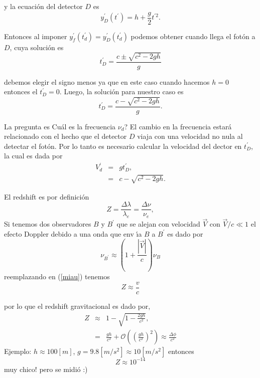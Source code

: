 \documentclass[notitlepage,11pt]{article}
\begin{document}
y la ecuación del detector $D$ es 
\begin{equation}
y_{D}^{\prime }\left( t^{\prime }\right) =h+\frac{g}{2}t^{\prime 2}.
\end{equation}

Entonces al imponer $y_{f}^{\prime }\left( t_{d}^{\prime }\right)
=y_{D}^{\prime }\left( t_{d}^{\prime }\right) $ podemos obtener cuando llega
el fotón a $D$, cuya solución es 
\begin{equation*}
t_{D}^{\prime }=\frac{c\pm \sqrt{c^{2}-2gh}}{g}
\end{equation*}

debemos elegir el signo menos ya que en este caso cuando hacemos $h=0$
entonces el $t_{D}^{\prime }=0$. Luego, la solución para nuestro caso es 
\begin{equation}
t_{D}^{\prime }=\frac{c-\sqrt{c^{2}-2gh}}{g}.
\end{equation}

La pregunta es \textquestiondown Cuál es la frecuencia $\nu _{d}$? El
cambio en la frecuencia estará relacionado con el hecho que el detector $%
D$ viaja con una velocidad no nula al detectar el fotón. Por lo tanto es
necesario calcular la velocidad del dector en $t_{D}^{\prime }$, la cual es
dada por 
\begin{eqnarray*}
V_{d}^{\prime } &=&gt_{D}^{\prime }, \\
&=&c-\sqrt{c^{2}-2gh}.
\end{eqnarray*}

El redshift es por definición 
\begin{equation}
Z=\frac{\Delta \lambda }{\lambda _{e}}=\frac{\Delta \nu }{\nu _{e}},
\label{miau}
\end{equation}%
Si tenemos dos observadores $B$ y $B^{\prime }$ que se alejan con velocidad $%
\vec{V}$ con $\vec{V}/c\ll 1$ el efecto Doppler debido a una onda que env%
\'{\i}a $B$ a $B^{\prime }$ es dado por 
\begin{equation*}
\nu _{B^{\prime }}\approx \left( 1+\frac{\left\vert \vec{V}\right\vert }{c}%
\right) \nu _{B}
\end{equation*}%
reemplazando en (\ref{miau}) tenemos%
\begin{equation*}
Z\approx \frac{v}{c}
\end{equation*}

por lo que el redshift gravitacional es dado por, 
\begin{eqnarray*}
Z &\approx &1-\sqrt{1-\frac{2gh}{c^{2}}}, \\
&=&\frac{gh}{c^{2}}+\mathcal{O}\left( \left( \frac{gh}{c^{2}}\right)
^{2}\right) \approx \frac{\Delta \phi }{c^{2}}
\end{eqnarray*}%
Ejemplo: $h\approx 100\left[ m\right] $, $g=9.8\left[ m/s^{2}\right] \approx
10\left[ m/s^{2}\right] $ entonces 
\begin{equation*}
Z\approx 10^{-14}
\end{equation*}%
muy chico! pero se midió :)
\end{document}
